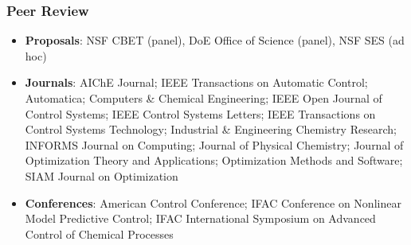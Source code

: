 \message{ !name(shin-abet.tex)}\documentclass[letterpaper, 11pt]{article}
\begin{document}
\subsubsection*{Peer Review}
\begin{itemize}[itemsep=1pt, parsep=0pt,leftmargin=*]
\item[] \textbf{Proposals}: NSF CBET (panel), DoE Office of Science (panel), NSF SES (ad hoc)
\item[] \textbf{Journals}: AIChE Journal; IEEE Transactions on Automatic Control; Automatica; Computers \& Chemical Engineering; IEEE Open Journal of Control Systems; IEEE Control Systems Letters; IEEE Transactions on Control Systems Technology; Industrial \& Engineering Chemistry Research; INFORMS Journal on Computing; Journal of Physical Chemistry; Journal of Optimization Theory and Applications; Optimization Methods and Software; SIAM Journal on Optimization
\item[] \textbf{Conferences}: American Control Conference; IFAC Conference on Nonlinear Model Predictive Control; IFAC International Symposium on Advanced Control of Chemical Processes 
\end{itemize}  

\end{document}
